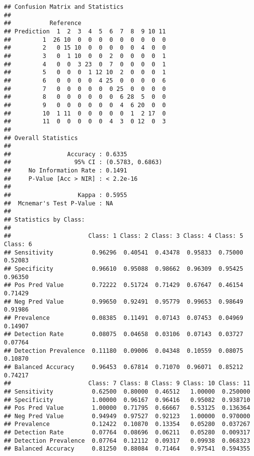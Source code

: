 \documentclass[]{article}
\newenvironment{Shaded}{\begin{snugshade}}{\end{snugshade}}
\newcommand{\KeywordTok}[1]{\textcolor[rgb]{0.13,0.29,0.53}{\textbf{#1}}}
\newcommand{\OperatorTok}[1]{\textcolor[rgb]{0.81,0.36,0.00}{\textbf{#1}}}
\newcommand{\NormalTok}[1]{#1}
\begin{document}
\begin{verbatim}
## Confusion Matrix and Statistics
## 
##           Reference
## Prediction  1  2  3  4  5  6  7  8  9 10 11
##         1  26 10  0  0  0  0  0  0  0  0  0
##         2   0 15 10  0  0  0  0  0  4  0  0
##         3   0  1 10  0  0  2  0  0  0  0  1
##         4   0  0  3 23  0  7  0  0  0  0  1
##         5   0  0  0  1 12 10  2  0  0  0  1
##         6   0  0  0  0  4 25  0  0  0  0  6
##         7   0  0  0  0  0  0 25  0  0  0  0
##         8   0  0  0  0  0  0  6 28  5  0  0
##         9   0  0  0  0  0  0  4  6 20  0  0
##         10  1 11  0  0  0  0  0  1  2 17  0
##         11  0  0  0  0  0  4  3  0 12  0  3
## 
## Overall Statistics
##                                           
##                Accuracy : 0.6335          
##                  95% CI : (0.5783, 0.6863)
##     No Information Rate : 0.1491          
##     P-Value [Acc > NIR] : < 2.2e-16       
##                                           
##                   Kappa : 0.5955          
##  Mcnemar's Test P-Value : NA              
## 
## Statistics by Class:
## 
##                      Class: 1 Class: 2 Class: 3 Class: 4 Class: 5 Class: 6
## Sensitivity           0.96296  0.40541  0.43478  0.95833  0.75000  0.52083
## Specificity           0.96610  0.95088  0.98662  0.96309  0.95425  0.96350
## Pos Pred Value        0.72222  0.51724  0.71429  0.67647  0.46154  0.71429
## Neg Pred Value        0.99650  0.92491  0.95779  0.99653  0.98649  0.91986
## Prevalence            0.08385  0.11491  0.07143  0.07453  0.04969  0.14907
## Detection Rate        0.08075  0.04658  0.03106  0.07143  0.03727  0.07764
## Detection Prevalence  0.11180  0.09006  0.04348  0.10559  0.08075  0.10870
## Balanced Accuracy     0.96453  0.67814  0.71070  0.96071  0.85212  0.74217
##                      Class: 7 Class: 8 Class: 9 Class: 10 Class: 11
## Sensitivity           0.62500  0.80000  0.46512   1.00000  0.250000
## Specificity           1.00000  0.96167  0.96416   0.95082  0.938710
## Pos Pred Value        1.00000  0.71795  0.66667   0.53125  0.136364
## Neg Pred Value        0.94949  0.97527  0.92123   1.00000  0.970000
## Prevalence            0.12422  0.10870  0.13354   0.05280  0.037267
## Detection Rate        0.07764  0.08696  0.06211   0.05280  0.009317
## Detection Prevalence  0.07764  0.12112  0.09317   0.09938  0.068323
## Balanced Accuracy     0.81250  0.88084  0.71464   0.97541  0.594355
\end{verbatim}

\begin{Shaded}
\end{Shaded}
\end{document}
